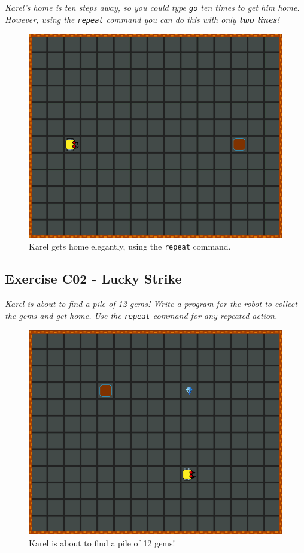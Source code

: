 {{{\em Karel's home is ten steps away, so you could type {\tt go} ten times to get him home. However, using the {\tt repeat} command you can do this with only {\bf two lines}! 

\begin{figure}[!ht]
\begin{center}
\includegraphics[height=0.4\textwidth]{imgk/c01.png}
\end{center}
\vspace{-4mm}
\caption{Karel gets home elegantly, using the {\tt repeat} command.}
\label{fig:c01}
\vspace{-4mm}
\end{figure}
\noindent


\subsection{Exercise C02 - Lucky Strike}

{\em Karel is about to find a pile of 12 gems! Write a program for the robot to collect the gems and get home. Use the {\tt repeat} command for any repeated action. 

\begin{figure}[!ht]
\begin{center}
\includegraphics[height=0.4\textwidth]{imgk/c02.png}
\end{center}
\vspace{-4mm}
\caption{Karel is about to find a pile of 12 gems!}
\label{fig:c02}
\vspace{-10mm}
\end{figure}
\newpage
\noindent


}}}}
